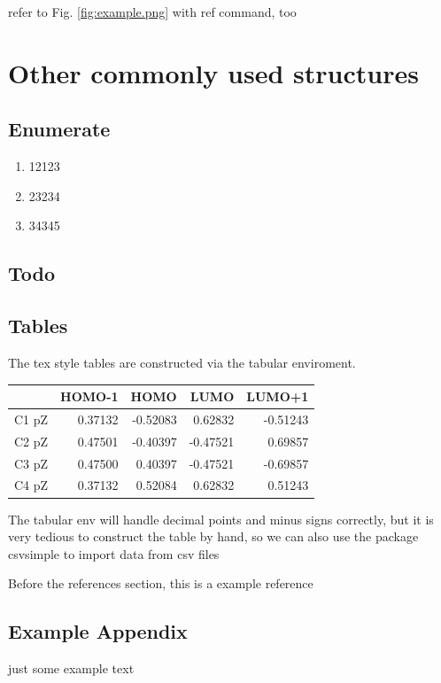 \documentclass{article}
\begin{document}
refer to Fig. \ref{fig:example.png} with ref command, too

\section{Other commonly used structures}

\subsection{Enumerate}

\begin{enumerate}
	\item 12123
	\item 23234
	\item 34345
\end{enumerate}

\subsection{Todo}


\subsection{Tables}

The tex style tables are constructed via the tabular enviroment. 

\begin{tabular}{l r r r r}
	      & HOMO-1  & HOMO     & LUMO     & LUMO+1   \\
	\hline
	C1 pZ & 0.37132 & -0.52083 & 0.62832  & -0.51243 \\
	C2 pZ & 0.47501 & -0.40397 & -0.47521 & 0.69857  \\
	C3 pZ & 0.47500 & 0.40397  & -0.47521 & -0.69857 \\
	C4 pZ & 0.37132 & 0.52084  & 0.62832  & 0.51243  \\
\end{tabular}

The tabular env will handle decimal points and minus signs correctly, but it is very tedious to construct the table by hand, so we can also use the package csvsimple to import data from csv files


Before the references section, this is a example reference\cite{craig2004quantum}






\newpage

\begin{appendices}

	\section{Example Appendix}

	just some example text

\end{appendices}

\newpage

\printglossaries
\end{document}
